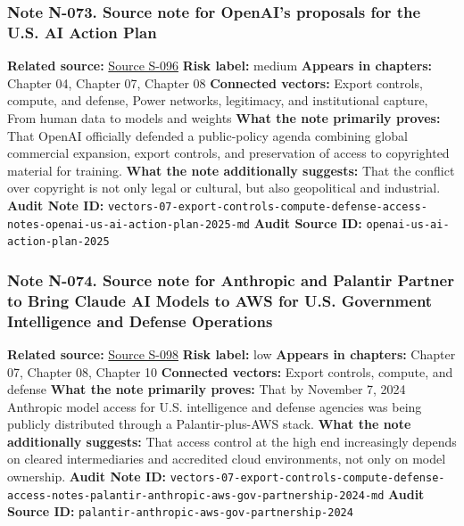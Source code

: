 \documentclass[
  american,
  11pt,
  letterpaper,
]{article}
\begin{document}
\subsubsection{Note N-073. Source note for OpenAI's proposals for the
U.S. AI Action
Plan}\label{note-n-073-vectors-07-export-controls-compute-defense-access-notes-openai-us-ai-action-plan-2025-md}

\textbf{Related source:}
\hyperref[source-s-096-openais-proposals-for-the-us-ai-action-plan]{Source
S-096} \textbf{Risk label:} medium \textbf{Appears in chapters:} Chapter
04, Chapter 07, Chapter 08 \textbf{Connected vectors:} Export controls,
compute, and defense, Power networks, legitimacy, and institutional
capture, From human data to models and weights \textbf{What the note
primarily proves:} That OpenAI officially defended a public-policy
agenda combining global commercial expansion, export controls, and
preservation of access to copyrighted material for training.
\textbf{What the note additionally suggests:} That the conflict over
copyright is not only legal or cultural, but also geopolitical and
industrial. \textbf{Audit Note ID:}
\texttt{vectors-07-export-controls-compute-defense-access-notes-openai-us-ai-action-plan-2025-md}
\textbf{Audit Source ID:} \texttt{openai-us-ai-action-plan-2025}

\subsubsection{Note N-074. Source note for Anthropic and Palantir
Partner to Bring Claude AI Models to AWS for U.S. Government
Intelligence and Defense
Operations}\label{note-n-074-vectors-07-export-controls-compute-defense-access-notes-palantir-anthropic-aws-gov-partnership-2024-md}

\textbf{Related source:}
\hyperref[source-s-098-anthropic-and-palantir-partner-to-bring-claude-ai-models-to-aws-for-u-s-government-intelligence-and-defense-operations]{Source
S-098} \textbf{Risk label:} low \textbf{Appears in chapters:} Chapter
07, Chapter 08, Chapter 10 \textbf{Connected vectors:} Export controls,
compute, and defense \textbf{What the note primarily proves:} That by
November 7, 2024 Anthropic model access for U.S. intelligence and
defense agencies was being publicly distributed through a
Palantir-plus-AWS stack. \textbf{What the note additionally suggests:}
That access control at the high end increasingly depends on cleared
intermediaries and accredited cloud environments, not only on model
ownership. \textbf{Audit Note ID:}
\texttt{vectors-07-export-controls-compute-defense-access-notes-palantir-anthropic-aws-gov-partnership-2024-md}
\textbf{Audit Source ID:}
\texttt{palantir-anthropic-aws-gov-partnership-2024}
\end{document}
